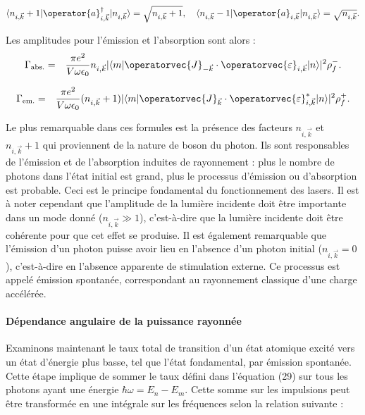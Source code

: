 \begin{eqnarray}
\langle n_{i,\vec{k}} + 1 | \operator{a}^{\dagger}_{i,\vec{k}} | n_{i,\vec{k}} \rangle = \sqrt{n_{i,\vec{k}} + 1}, \quad \langle n_{i,\vec{k}} - 1 | \operator{a}_{i,\vec{k}} | n_{i,\vec{k}} \rangle = \sqrt{n_{i,\vec{k}}}.
\end{eqnarray}

Les amplitudes pour l'émission et l'absorption sont alors :\\

\begin{eqnarray}
\Gamma_{\text{abs}.}  & = & \frac{ \pi e^2}{V \omega \epsilon_0}  n_{i,\vec{k}} \vert \langle m | \operatorvec{J}_{-\vec{k}} \cdot \operatorvec{\varepsilon}_{ i , \vec{k}}  | n \rangle \vert^2 \rho_f^-.
\end{eqnarray}

\begin{eqnarray}
\Gamma_{\text{em}.}  & = & \frac{ \pi e^2}{V \omega \epsilon_0} (  n_{i,\vec{k}} + 1 )  \vert \langle m | \operatorvec{J}_{\vec{k}} \cdot \operatorvec{\varepsilon}_{ i , \vec{k}}^\ast  | n \rangle \vert^2 \rho_f^+.
\end{eqnarray}


Le plus remarquable dans ces formules est la présence des facteurs $n_{i,\vec{k}}$ et $n_{i,\vec{k}} + 1$ qui proviennent de la nature de boson du photon. Ils sont responsables de l'émission et de l'absorption induites de rayonnement : plus le nombre de photons dans l'état initial est grand, plus le processus d'émission ou d'absorption est probable. Ceci est le principe fondamental du fonctionnement des lasers. Il est à noter cependant que l'amplitude de la lumière incidente doit être importante dans un mode donné ($n_{i,\vec{k}} \gg 1$), c'est-à-dire que la lumière incidente doit être cohérente pour que cet effet se produise. Il est également remarquable que l'émission d'un photon puisse avoir lieu en l'absence d'un photon initial ($n_{i,\vec{k}} = 0$), c'est-à-dire en l'absence apparente de stimulation externe. Ce processus est appelé émission spontanée, correspondant au rayonnement classique d'une charge accélérée.

\paragraph{Dépendance angulaire de la puissance rayonnée}

Examinons maintenant le taux total de transition d'un état atomique excité vers un état d'énergie plus basse, tel que l'état fondamental, par émission spontanée. Cette étape implique de sommer le taux défini dans l'équation (29) sur tous les photons ayant une énergie $\hbar \omega  = E_n - E_m$. Cette somme sur les impulsions peut être transformée en une intégrale sur les fréquences selon la relation suivante :

